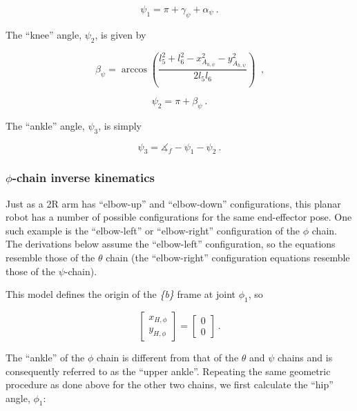 \documentclass{report}
\begin{document}
\begin{equation}
\psi_1 = \pi + \gamma_\psi + \alpha_\psi\ \text{.}
\end{equation}

The ``knee'' angle, $\psi_2$, is given by

\begin{equation*}
\beta_\psi = \arccos{\left( \frac{l_5^2 + l_6^2 - x_{A_{h,\psi}}^2 - y_{A_{h,\psi}} ^2}{2 l_5 l_6}\right) }\ \text{ ,}
\end{equation*}

\begin{equation}
\psi_2 = \pi + \beta_\psi\ \text{.}
\end{equation}

The ``ankle'' angle, $\psi_3$, is simply

\begin{equation}
\psi_3 = \measuredangle_f - \psi_1 - \psi_2\ \text{.}
\end{equation}

\subsubsection[$\phi$-chain inverse kinematics]{$\phi$-chain inverse kinematics}

Just as a 2R arm has ``elbow-up'' and ``elbow-down'' configurations, this planar robot has a number of possible configurations for the same end-effector pose. One such example is the ``elbow-left'' or ``elbow-right'' configuration of the $\phi$ chain. The derivations below assume the ``elbow-left'' configuration, so the equations resemble those of the $\theta$ chain (the ``elbow-right'' configuration equations resemble those of the $\psi$-chain).

This model defines the origin of the \textit{\{b\}} frame at joint $\phi_1$, so

\begin{equation*}
\begin{bmatrix}
x_{H,\phi}\\
y_{H,\phi}
\end{bmatrix} = \begin{bmatrix}
0\\
0
\end{bmatrix}\ \text{.}
\end{equation*}

The ``ankle'' of the $\phi$ chain is different from that of the $\theta$ and $\psi$ chains and is consequently referred to as the ``upper ankle''. Repeating the same geometric procedure as done above for the other two chains, we first calculate the ``hip'' angle, $\phi_1$:
\end{document}
